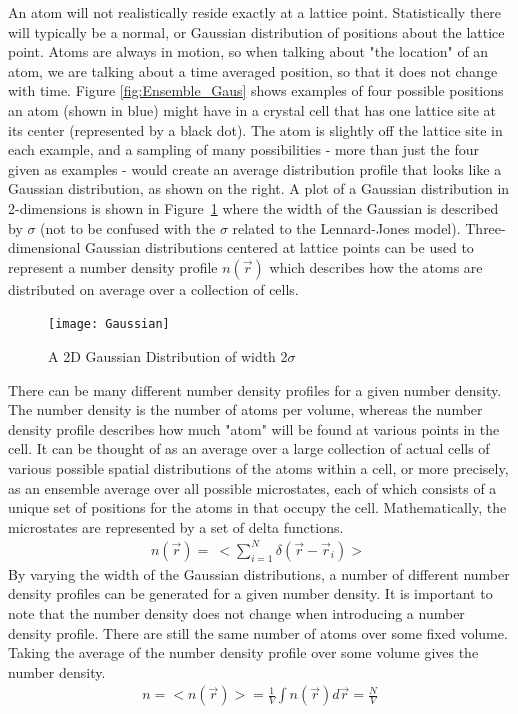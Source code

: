 \documentclass[double,12pt]{beavtex}
\begin{document}
An atom will not realistically reside exactly at a lattice point. 
Statistically there will typically be a normal, or Gaussian distribution 
of positions about the lattice point. 
Atoms are always in motion, so when talking about "the location" 
of an atom, we are talking about a time averaged position, so that it 
does not change with time.
Figure \ref{fig:Ensemble_Gaus} shows examples 
of four possible positions an atom (shown in blue) might have in a crystal 
cell that has one lattice site at its center (represented by a black dot). 
The atom is slightly off the lattice site in each example, and 
a sampling of many possibilities - more than just the four given 
as examples - would create an average distribution profile that looks 
like a Gaussian distribution, as shown on the right.
A plot of a Gaussian distribution in 2-dimensions is shown in 
Figure~\ref{fig:Gaus_plot} where the width of the Gaussian is described 
by $\sigma$ (not to be confused with the $\sigma$ related to the 
Lennard-Jones model). 
Three-dimensional Gaussian distributions centered at lattice points can be 
used to represent a number density profile $n(\vec{r})$  which describes 
how the atoms are distributed on average over a collection of cells. 

\begin{figure}
  \centering
  \texttt{[image: Gaussian]}
  \caption{A 2D Gaussian Distribution of width 2$\sigma$}
  \label{fig:Gaus_plot}
\end{figure}  
  
There can be many different number density profiles for a given number
density. The number density is the number of atoms per volume, whereas
the number density profile describes how much "atom" will be found at various 
points in the cell. 
It can be thought of as an average over a large collection of actual cells
of various possible spatial distributions of the atoms within a cell, or
more precisely, as an ensemble average over all possible microstates, 
each of which consists of a unique set of positions for the atoms in 
that occupy the cell. Mathematically, the microstates are represented 
by a set of delta functions.
\begin{align}
    n(\vec r)=~<\sum_{i=1}^N\delta(\vec r - \vec r_i)>~
\end{align} 
By varying the width of the Gaussian distributions, a number of different 
number density profiles can be generated for a given number density.
It is important to note that the number density does not change when 
introducing a number density profile.  
There are still the same number of atoms over some fixed volume. 
Taking the average of the number density profile over some volume 
gives the number density. 
\begin{align}
    n=<n(\vec{r})>=\frac{1}{V}\int{n(\vec{r})}{d\vec{r}}=\frac{N}{V}
\end{align}
\end{document}
